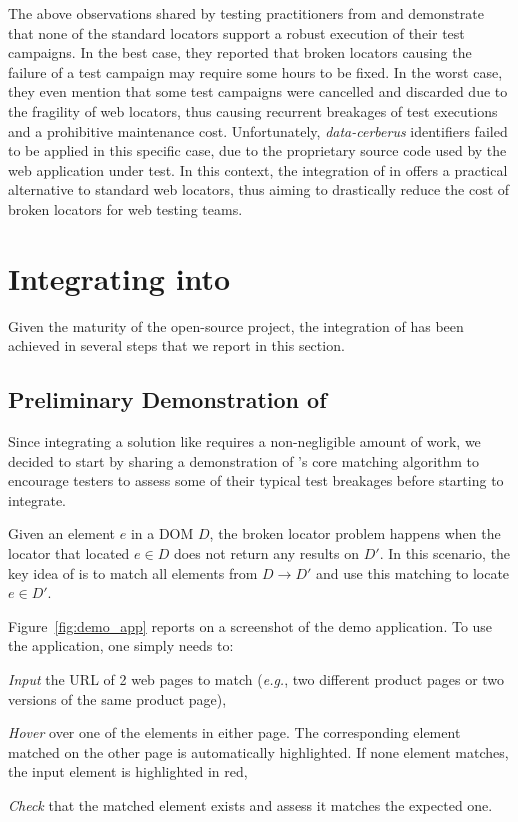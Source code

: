 The above observations shared by testing practitioners from \laredoute{} and \cerberus demonstrate that none of the standard locators support a robust execution of their test campaigns.
In the best case, they reported that broken locators causing the failure of a test campaign may require some hours to be fixed.
In the worst case, they even mention that some test campaigns were cancelled and discarded due to the fragility of web locators, thus causing recurrent breakages of test executions and a prohibitive maintenance cost.
Unfortunately, \textit{data-cerberus} identifiers failed to be applied in this specific case, due to the proprietary source code used by the web application under test.
In this context, the integration of \erratum{} in \cerberus{} offers a practical alternative to standard web locators, thus aiming to drastically reduce the cost of broken locators for web testing teams.

\section{Integrating \erratum into \cerberus}\label{sec:integration}
Given the maturity of the \cerberus open-source project, the integration of \erratum{} has been achieved in several steps that we report in this section.

\subsection{Preliminary Demonstration of \erratum}\label{sec:demo}
Since integrating a solution like \erratum requires a non-negligible amount of work, we decided to start by sharing a demonstration of \erratum's core matching algorithm to encourage testers to assess some of their typical test breakages before starting to integrate.

Given an element $e$ in a DOM $D$, the broken locator problem happens when the locator that located $e \in D$ does not return any results on $D'$.
In this scenario, the key idea of \erratum is to match all elements from $D \to D'$ and use this matching to locate $e \in D'$.

Figure~\ref{fig:demo_app} reports on a screenshot of the demo application.
To use the application, one simply needs to:
\begin{compactenum}[\em i)]
    \item \emph{Input} the URL of 2 web pages to match (\emph{e.g.}, two different product pages or two versions of the same product page),
    \item \emph{Hover} over one of the elements in either page. The corresponding element matched on the other page is automatically highlighted. If none element matches, the input element is highlighted in red,
    \item \emph{Check} that the matched element exists and assess it matches the expected one.
\end{compactenum}

